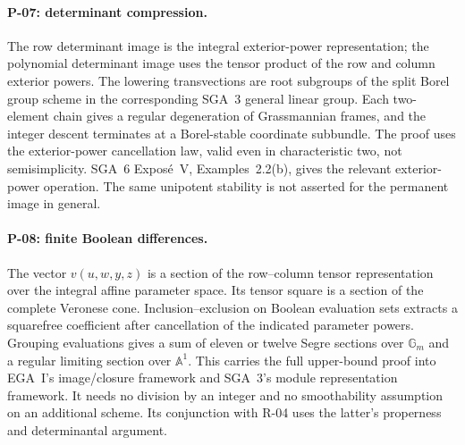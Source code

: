 \paragraph{P-07: determinant compression.}
The row determinant image is the integral exterior-power
representation; the polynomial determinant image uses
the tensor product of the row and column exterior powers.
The lowering transvections are root subgroups of the
split Borel group scheme in the corresponding SGA~3
general linear group. Each two-element chain gives a
regular degeneration of Grassmannian frames, and the
integer descent terminates at a Borel-stable coordinate
subbundle. The proof uses the exterior-power cancellation
law, valid even in characteristic two, not semisimplicity.
SGA~6 Expos\'e~V, Examples~2.2(b), gives the relevant
exterior-power operation. The same unipotent stability
is not asserted for the permanent image in general.

\paragraph{P-08: finite Boolean differences.}
The vector $v(u,w,y,z)$ is a section of the row--column
tensor representation over the integral affine parameter
space. Its tensor square is a section of the complete
Veronese cone. Inclusion--exclusion on Boolean evaluation
sets extracts a squarefree coefficient after cancellation
of the indicated parameter powers. Grouping evaluations
gives a sum of eleven or twelve Segre sections over
$\mathbb G_m$ and a regular limiting section over
$\mathbb A^1$. This carries the full upper-bound proof
into EGA~I's image/closure framework and SGA~3's module
representation framework. It needs no division by an
integer and no smoothability assumption on an additional
scheme. Its conjunction with R-04 uses the latter's
properness and determinantal argument.

